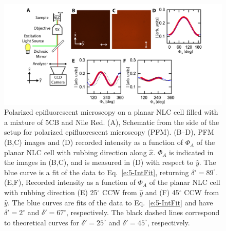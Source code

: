 \begin{figure}
  \centering
  \includegraphics{figures/C5/Ch5-Figs_PFM_FlatCell.png}
  \caption{Polarized epifluorescent microscopy on a planar NLC cell filled with a mixture of 5CB and Nile Red.
  (A), Schematic from the side of the setup for polarized epifluorescent microscopy (PFM).
  (B--D), PFM (B,C) images and (D) recorded intensity as a function of $\Phi_A$ of the planar NLC cell with rubbing direction along $\hat{x}$.
  $\Phi_A$ is indicated in the images in (B,C), and is measured in (D) with respect to $\hat{y}$.
  The blue curve is a fit of the data to Eq.~\ref{e:5-IntFit}, returning $\delta' = 89^{\circ}$.
  (E,F), Recorded intensity as a function of $\Phi_A$ of the planar NLC cell with rubbing direction (E) 25$^{\circ}$ CCW from $\hat{y}$ and (F) 45$^{\circ}$ CCW from $\hat{y}$.
  The blue curves are fits of the data to Eq.~\ref{e:5-IntFit} and have $\delta' = 2^{\circ}$ and $\delta' = 67^{\circ}$, respectively.
  The black dashed lines correspond to theoretical curves for $\delta' = 25^{\circ}$ and $\delta' = 45^{\circ}$, respectively.}\label{f:5-PFM_FlatCell}
\end{figure}


